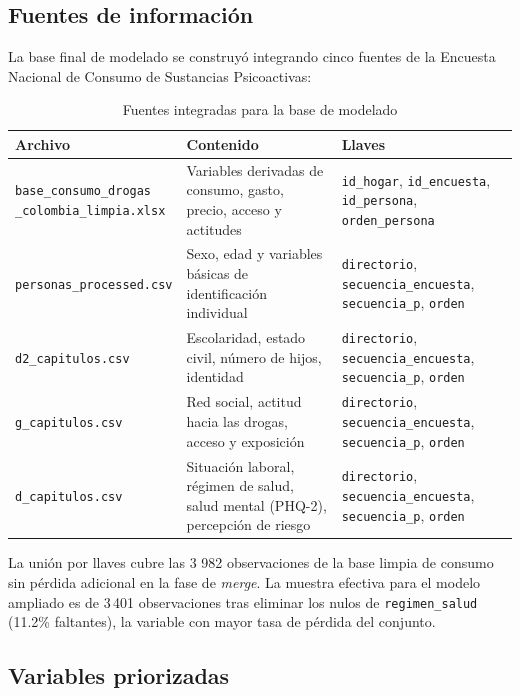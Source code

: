 \documentclass[12pt, a4paper]{article}
\begin{document}
\subsection{Fuentes de información}

La base final de modelado se construyó integrando cinco fuentes de la Encuesta Nacional de Consumo de Sustancias Psicoactivas:

\begin{table}[H]
\centering
\small
\begin{tabular}{p{3.8cm} p{6.5cm} p{4.2cm}}
\toprule
\textbf{Archivo} & \textbf{Contenido} & \textbf{Llaves} \\
\midrule
\parbox[t]{3.8cm}{\texttt{base\_consumo\_drogas}\\\texttt{\_colombia\_limpia.xlsx}}
& Variables derivadas de consumo, gasto, precio, acceso y actitudes
& \texttt{id\_hogar}, \texttt{id\_encuesta}, \texttt{id\_persona}, \texttt{orden\_persona} \\
\texttt{personas\_processed.csv} & Sexo, edad y variables básicas de identificación individual & \texttt{directorio}, \texttt{secuencia\_encuesta}, \texttt{secuencia\_p}, \texttt{orden} \\
\texttt{d2\_capitulos.csv} & Escolaridad, estado civil, número de hijos, identidad & \texttt{directorio}, \texttt{secuencia\_encuesta}, \texttt{secuencia\_p}, \texttt{orden} \\
\texttt{g\_capitulos.csv} & Red social, actitud hacia las drogas, acceso y exposición & \texttt{directorio}, \texttt{secuencia\_encuesta}, \texttt{secuencia\_p}, \texttt{orden} \\
\texttt{d\_capitulos.csv} & Situación laboral, régimen de salud, salud mental (PHQ-2), percepción de riesgo & \texttt{directorio}, \texttt{secuencia\_encuesta}, \texttt{secuencia\_p}, \texttt{orden} \\
\bottomrule
\end{tabular}
\caption{Fuentes integradas para la base de modelado}
\label{tab:fuentes}
\end{table}

La unión por llaves cubre las 3 982 observaciones de la base limpia de consumo sin pérdida adicional en la fase de \textit{merge}. La muestra efectiva para el modelo ampliado es de 3\,401 observaciones tras eliminar los nulos de \texttt{regimen\_salud} (11.2\% faltantes), la variable con mayor tasa de pérdida del conjunto.

\subsection{Variables priorizadas}
\end{document}
